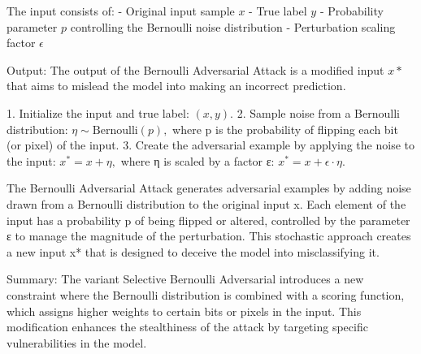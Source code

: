 The input consists of:
- Original input sample $x$
- True label $y$
- Probability parameter $p$ controlling the Bernoulli noise distribution
- Perturbation scaling factor $\epsilon$

Output: The output of the Bernoulli Adversarial Attack is a modified input $x*$ that aims to mislead the model into making an incorrect prediction.

1. Initialize the input and true label:
   $
   (x, y).
   $
2. Sample noise from a Bernoulli distribution:
   $
   \eta \sim \text{Bernoulli}(p),
   $
   where p is the probability of flipping each bit (or pixel) of the input.
3. Create the adversarial example by applying the noise to the input:
   $
   x^* = x + \eta,
   $
   where η is scaled by a factor ε:
   $
   x^* = x + \epsilon \cdot \eta.
   $

The Bernoulli Adversarial Attack generates adversarial examples by adding noise drawn from a Bernoulli distribution to the original input x. Each element of the input has a probability p of being flipped or altered, controlled by the parameter ε to manage the magnitude of the perturbation. This stochastic approach creates a new input x* that is designed to deceive the model into misclassifying it.

Summary: The variant Selective Bernoulli Adversarial introduces a new constraint where the Bernoulli distribution is combined with a scoring function, which assigns higher weights to certain bits or pixels in the input. This modification enhances the stealthiness of the attack by targeting specific vulnerabilities in the model.